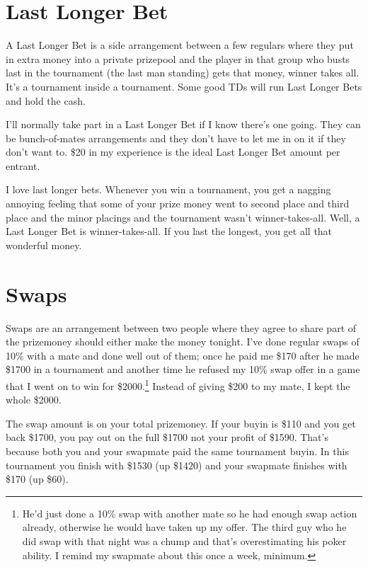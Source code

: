 \section{Last Longer Bet}

A Last Longer Bet is a side arrangement between a few regulars
where they put in extra money into a private prizepool and the player
in that group who busts last in the tournament (the last man standing)
gets that money, winner takes all. It's a tournament inside a tournament.
Some good TDs will run Last Longer Bets and hold the cash.

I'll normally take part in a Last Longer Bet if I know there's one
going. They can be bunch-of-mates arrangements and
they don't have to let me in on it if they don't want to. \$20 in my
experience is the ideal Last Longer Bet amount per entrant.

I love last longer bets. Whenever you win a tournament, you get a
nagging annoying feeling that some of your prize money went to second
place and third place and the minor placings and the tournament wasn't
winner-takes-all. Well, a Last Longer Bet is winner-takes-all. If you
last the longest, you get all that wonderful money.

\section{Swaps}


Swaps are an arrangement between two people where they
agree to share part of the prizemoney should
either make the money tonight. I've done regular swaps of 10\% with a mate and
done well out of them; once he paid me
\$170 after he made \$1700 in a tournament and another time
he refused my 10\% swap offer in a game that I
went on to win for \$2000.\footnote{He'd
just done a 10\% swap with another mate so he had enough swap action
already, otherwise he would have taken up my offer. The third
guy who he did swap with that night was a chump and that's
overestimating his poker ability. I remind my swapmate about this once
a week, minimum.} Instead of giving \$200 to my mate, I kept the whole
\$2000.

The swap amount is on your total prizemoney. If your buyin is
\$110 and you get back \$1700, you pay out on the full
\$1700 not your profit of \$1590. That's because both you and your
swapmate paid the same tournament buyin.
In this tournament you finish with \$1530 (up \$1420) and your swapmate
finishes with \$170 (up \$60).


